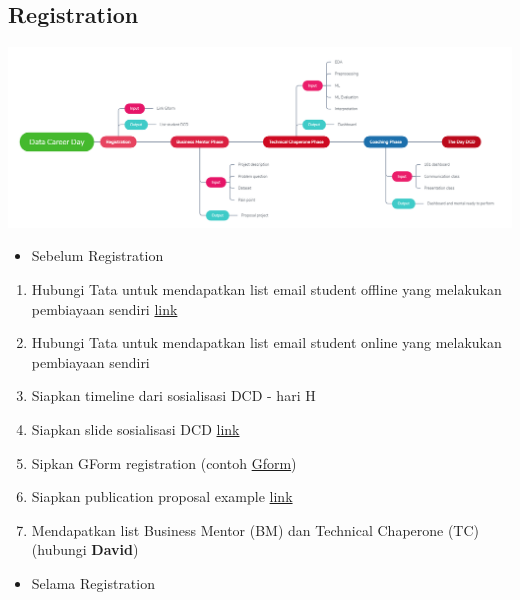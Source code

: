 \documentclass[
]{book}
\providecommand{\tightlist}{%
  \setlength{\itemsep}{0pt}\setlength{\parskip}{0pt}}
\begin{document}
\hypertarget{registration}{%
\subsection{Registration}\label{registration}}

\includegraphics{assets/workflow.png}

\begin{itemize}
\tightlist
\item
  Sebelum Registration
\end{itemize}

\begin{enumerate}
\def\labelenumi{\arabic{enumi}.}
\tightlist
\item
  Hubungi Tata untuk mendapatkan list email student offline yang melakukan pembiayaan sendiri \href{https://docs.google.com/spreadsheets/d/1iZy0AaFASL7IY5BIGZmaOsIqkdX6LR6Mo2gpJZEG2KA/edit\#gid=1637612767}{link}
\item
  Hubungi Tata untuk mendapatkan list email student online yang melakukan pembiayaan sendiri
\item
  Siapkan timeline dari sosialisasi DCD - hari H
\item
  Siapkan slide sosialisasi DCD \href{https://docs.google.com/presentation/d/1acPcUvZG85oEJsLtOGJx3FINGa8Rrhv-CBt-tqAJG_M/edit\#slide=id.p1}{link}
\item
  Sipkan GForm registration (contoh \href{bit.ly/registdcd9}{Gform})
\item
  Siapkan publication proposal example \href{bit.ly/publicationexample}{link}
\item
  Mendapatkan list Business Mentor (BM) dan Technical Chaperone (TC) (hubungi \textbf{David})
\end{enumerate}

\begin{itemize}
\tightlist
\item
  Selama Registration
\end{itemize}
\end{document}
